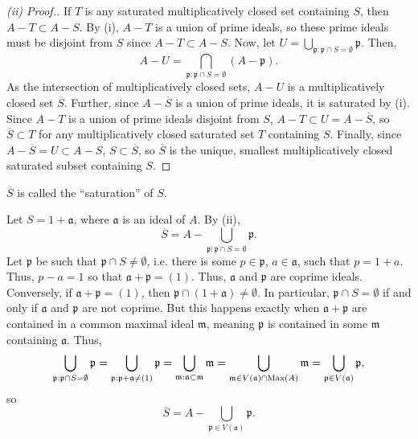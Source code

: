 \begin{proof}[(ii) Proof.]
If $T$ is any saturated multiplicatively closed set containing $S$, then $A - T \subset A - S$. By (i), $A - T$ is a union of prime ideals, so these prime ideals must be disjoint from $S$ since $A - T \subset A - S$.
Now, let $U = \bigcup_{\mathfrak{p} : \mathfrak{p} \cap S = \emptyset}\mathfrak{p}$. Then, 
$$A - U = \bigcap_{\mathfrak{p} : \mathfrak{p} \cap S = \emptyset}(A - \mathfrak{p}).$$
As the intersection of multiplicatively closed sets, $A-U$ is a multiplicatively closed set $\overline{S}$. Further, since $A - \overline{S}$ is a union of prime ideals, it is saturated by (i). Since $A - T$ is a union 
of prime ideals disjoint from $S$, $A - T \subset U = A - \overline{S}$, so $\overline{S} \subset T$ for any multiplicatively closed saturated set $T$ containing $S$. Finally, since $A - \overline{S} = U \subset A - S$, 
$S \subset \overline{S}$, so $\overline{S}$ is the unique, smallest multiplicatively closed saturated subset containing $S$.
\end{proof}

\begin{remark}
$\overline{S}$ is called the ``saturation'' of $S$.
\end{remark}

Let $S = 1 + \mathfrak{a}$, where $\mathfrak{a}$ is an ideal of $A$. By (ii), 
$$\overline{S} = A - \bigcup_{\mathfrak{p} : \mathfrak{p} \cap S = \emptyset} \mathfrak{p}.$$
Let $\mathfrak{p}$ be such that $\mathfrak{p} \cap S \neq \emptyset$, i.e. there is some $p \in \mathfrak{p}$, $a \in \mathfrak{a}$, such that $p = 1 + a$. Thus, $p - a = 1$ so that $\mathfrak{a} + \mathfrak{p} = (1)$. Thus,
$\mathfrak{a}$ and $\mathfrak{p}$ are coprime ideals. Conversely, if $\mathfrak{a} + \mathfrak{p} = (1)$, then $\mathfrak{p} \cap (1 + \mathfrak{a}) \neq \emptyset$. In particular, $\mathfrak{p} \cap S = \emptyset$ if and only
if $\mathfrak{a}$ and $\mathfrak{p}$ are not coprime. But this happens exactly when $\mathfrak{a} + \mathfrak{p}$ are contained in a common maximal ideal $\mathfrak{m}$, meaning $\mathfrak{p}$ is contained in some $\mathfrak{m}$
containing $\mathfrak{a}$. Thus, 
$$\bigcup_{\mathfrak{p} : \mathfrak{p} \cap S = \emptyset} \mathfrak{p} = \bigcup_{\mathfrak{p} : \mathfrak{p} + \mathfrak{a} \neq (1)} \mathfrak{p} = \bigcup_{\mathfrak{m} : \mathfrak{a} \subset \mathfrak{m}} \mathfrak{m}
= \bigcup_{\mathfrak{m} \in V(\mathfrak{a})\cap\operatorname{Max}(A)}\mathfrak{m} = \bigcup_{\mathfrak{p} \in V(\mathfrak{a})}\mathfrak{p},$$
so
$$\overline{S} = A - \bigcup_{\mathfrak{p} \in V(\mathfrak{a})}\mathfrak{p}.$$

